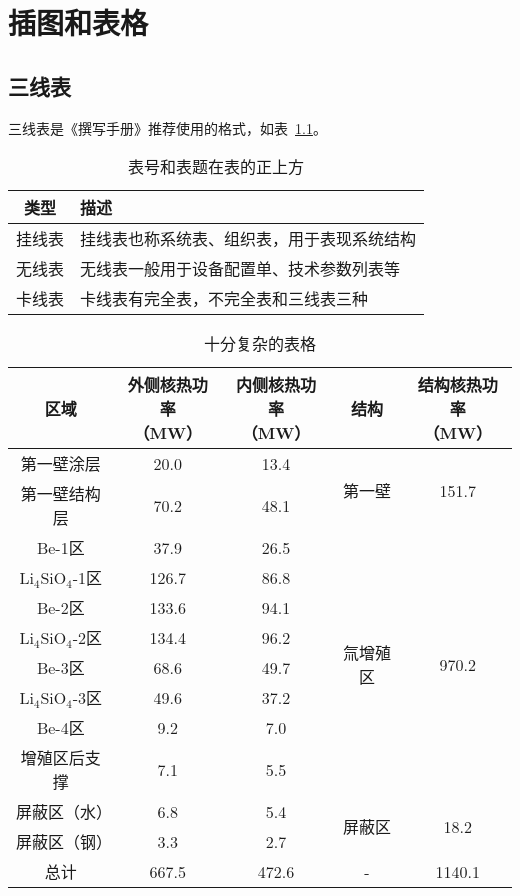 
\chapter{插图和表格}

\section{三线表}

三线表是《撰写手册》推荐使用的格式，如表~\ref{tab:exampletable}。

\begin{table}
  \centering
  \caption{表号和表题在表的正上方}
  \label{tab:exampletable}
  \begin{tabular}{cl}
    \toprule
    类型   & 描述                                       \\
    \midrule
    挂线表 & 挂线表也称系统表、组织表，用于表现系统结构 \\
    无线表 & 无线表一般用于设备配置单、技术参数列表等   \\
    卡线表 & 卡线表有完全表，不完全表和三线表三种       \\
    \bottomrule
  \end{tabular}
\end{table}

\begin{table}[h] %
	\centering
	\caption{十分复杂的表格}
	\begin{tabular}{*{5}{c}}
		\toprule
		区域 & \tabincell{c}{外侧核热功率\\（MW）} & \tabincell{c}{内侧核热功率\\（MW）} & 结构 & \tabincell{c}{结构核热功率\\（MW）} \\
		\midrule
		第一壁涂层 & 20.0 & 13.4 & \multirow{2}{*}{第一壁} & \multirow{2}{*}{151.7} \\
		第一壁结构层 & 70.2 & 48.1 & ~ & ~ \\
		\midrule
		Be-1区 & 37.9 & 26.5 & \multirow{8}{*}{氚增殖区} & \multirow{8}{*}{970.2} \\ 
		Li$ _{\text{4}} $SiO$ _{\text{4}} $-1区 & 126.7 & 86.8 & ~ & ~ \\
		Be-2区 & 133.6 & 94.1 & ~ & ~ \\
		Li$ _{\text{4}} $SiO$ _{\text{4}} $-2区 & 134.4 & 96.2 & ~ & ~ \\
		Be-3区 & 68.6 & 49.7 & ~ & ~ \\
		Li$ _{\text{4}} $SiO$ _{\text{4}} $-3区 & 49.6 & 37.2 & ~ & ~ \\
		Be-4区 & 9.2 & 7.0 & ~ & ~ \\
		增殖区后支撑 & 7.1 & 5.5 & ~ & ~ \\
		\midrule
		屏蔽区（水） & 6.8 & 5.4 & \multirow{2}{*}{屏蔽区} & \multirow{2}{*}{18.2} \\
		屏蔽区（钢） & 3.3 & 2.7 & ~ & ~ \\
		\midrule
		总计 & 667.5 & 472.6 & - & 1140.1 \\
		\bottomrule
	\end{tabular}
	\label{nucheat_tot}
\end{table}

